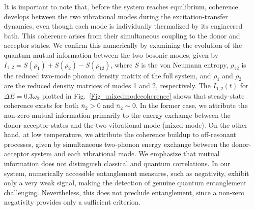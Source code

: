\documentclass[
reprint,
superscriptaddress,

amsmath,amssymb,
aps,
prl,

floatfix,
]{revtex4-2}
\begin{document}
It is important to note that, before the system reaches equilibrium, coherence develops between the two vibrational modes during the excitation-transfer dynamics, even though each mode is individually thermalized by its engineered bath. This coherence arises from their simultaneous coupling to the donor and acceptor states. We confirm this numerically by examining the evolution of the quantum mutual information between the two bosonic modes, given by $I_{1,2}=S(\rho_1)+S(\rho_2)-S(\rho_{12})$, where $S$ is the von Neumann entropy, $\rho_{12}$ is the reduced two-mode phonon density matrix of the full system, and $\rho_1$ and $\rho_2$ are the reduced density matrices of modes 1 and 2, respectively. The $I_{1,2}(t)$ for $\Delta E = 0.3\omega_2$ plotted in Fig.~\ref{Fig_mixedmodecoherence} shows that steady-state coherence exists for both $\bar{n}_2>0$ and $\bar{n}_2\sim0$. In the former case, we attribute the non-zero mutual information primarily to the energy exchange between the donor-acceptor states and the two vibrational mode (mixed-mode). On the other hand, at low temperature, we attribute the coherence buildup to off-resonant processes, given by simultaneous two-phonon energy exchange between the donor-acceptor system and each vibrational mode. We emphasize that mutual information does not distinguish classical and quantum correlations. In our system, numerically accessible entanglement measures, such as negativity, exhibit only a very weak signal, making the detection of genuine quantum entanglement challenging. Nevertheless, this does not preclude entanglement, since a non-zero negativity provides only a sufficient criterion.
\end{document}
